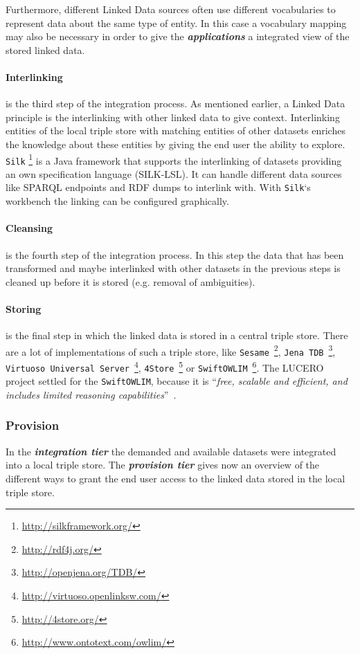 \documentclass{article}
\begin{document}
Furthermore, different Linked Data sources often use different vocabularies to represent data about the same type of entity.\cite{berners-lee_fractal_2008} In this case a vocabulary mapping may also be necessary in order to give the \textit{\textbf{applications}} a integrated view of the stored linked data. 

\paragraph{Interlinking} is the third step of the integration process. As mentioned earlier, a Linked Data principle is the interlinking with other linked data to give context. Interlinking entities of the local triple store with matching entities of other datasets enriches the knowledge about these entities by giving the end user the ability to explore. \texttt{Silk} \footnote{\url{http://silkframework.org/}} is a Java framework that supports the interlinking of datasets providing an own specification language (SILK-LSL). It can handle different data sources like SPARQL endpoints and RDF dumps to interlink with. With \texttt{Silk}`s workbench the linking can be configured graphically.

\paragraph{Cleansing} is the fourth step of the integration process. In this step the data that has been transformed and maybe interlinked with other datasets in the previous steps is cleaned up before it is stored (e.g. removal of ambiguities).

\paragraph{Storing} is the final step in which the linked data is stored in a central triple store. There are a lot of implementations of such a triple store, like 
\texttt{Sesame}~\footnote{\url{http://rdf4j.org/}}, 
\texttt{Jena TDB}~\footnote{\url{http://openjena.org/TDB/}},
\texttt{Virtuoso Universal Server}~\footnote{\url{http://virtuoso.openlinksw.com/}},
\texttt{4Store}~\footnote{\url{http://4store.org/}} or 
\texttt{SwiftOWLIM}~\footnote{\url{http://www.ontotext.com/owlim/}}. The LUCERO project settled for the \texttt{SwiftOWLIM}, because it is ``\textit{free, scalable and efficient, and includes limited reasoning capabilities}''~\cite{daquin_lucero_2010-1}.

\subsubsection{Provision}
\label{technical-architecture-challenges:proposal:provision}
In the \textit{\textbf{integration tier}} the demanded and available datasets were integrated into a local triple store. The \textit{\textbf{provision tier}} gives now an overview of the different ways to grant the end user access to the linked data stored in the local triple store.
\end{document}
